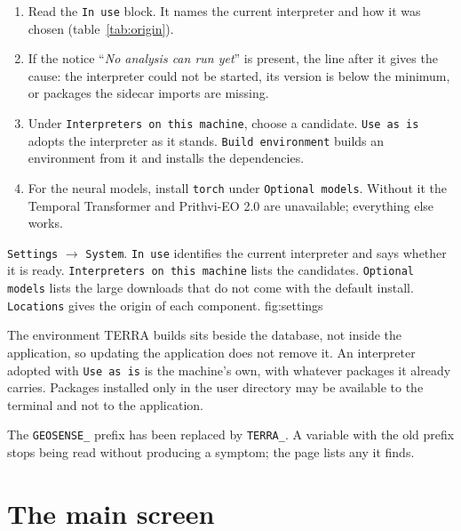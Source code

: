 \documentclass[12pt,a4paper]{article}
\newcommand{\msg}[1]{``\textit{#1}''}
\begin{document}
\begin{enumerate}[leftmargin=*,itemsep=.25em]
  \item Read the \texttt{In use} block. It names the current interpreter and
        how it was chosen (table~\ref{tab:origin}).
  \item If the notice \msg{No analysis can run yet} is present, the line after
        it gives the cause: the interpreter could not be started, its version
        is below the minimum, or packages the sidecar imports are missing.
  \item Under \texttt{Interpreters on this machine}, choose a candidate.
        \texttt{Use as is} adopts the interpreter as it stands.
        \texttt{Build environment} builds an environment from it and installs
        the dependencies.
  \item For the neural models, install \texttt{torch} under \texttt{Optional
        models}. Without it the Temporal Transformer and Prithvi-EO 2.0 are
        unavailable; everything else works.
\end{enumerate}

  {\texttt{Settings} $\rightarrow$ \texttt{System}. \texttt{In use} identifies
   the current interpreter and says whether it is ready. \texttt{Interpreters
   on this machine} lists the candidates. \texttt{Optional models} lists the
   large downloads that do not come with the default install.
   \texttt{Locations} gives the origin of each component.}
  {fig:settings}

\begin{aviso}
The environment TERRA builds sits beside the database, not inside the
application, so updating the application does not remove it. An interpreter
adopted with \texttt{Use as is} is the machine's own, with whatever packages it
already carries. Packages installed only in the user directory may be available
to the terminal and not to the application.

The \texttt{GEOSENSE\_} prefix has been replaced by \texttt{TERRA\_}. A variable
with the old prefix stops being read without producing a symptom; the page
lists any it finds.
\end{aviso}

\section{The main screen}
\end{document}

